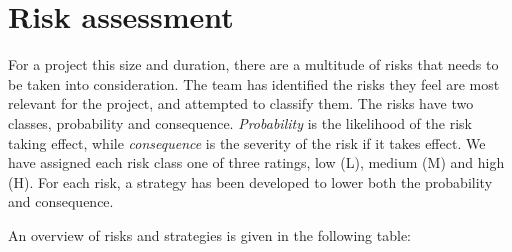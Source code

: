 \documentclass[11pt,a4paper,titlepage,oneside]{report}
\begin{document}
\section{Risk assessment}
For a project this size and duration, there are a multitude of risks that needs to be taken into consideration. The team has identified the risks they feel are most relevant for the project, and attempted to classify them. The risks have two classes, probability and consequence. \textit{Probability} is the likelihood of the risk taking effect, while \textit{consequence} is the severity of the risk if it takes effect. We have assigned each risk class one of three ratings, low (L), medium (M) and high (H). For each risk, a strategy has been developed to lower both the probability and consequence. 

An overview of risks and strategies is given in the following table:
\end{document}
